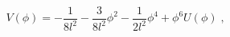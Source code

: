 \begin{equation}
V(\phi )=-\frac{1}{8l^{2}}-\frac{3}{8l^{2}}\phi ^{2}-\frac{1}{2l^{2}}\phi
^{4}+\phi ^{6}U(\phi )\;,  \label{Generic Potential}
\end{equation}

